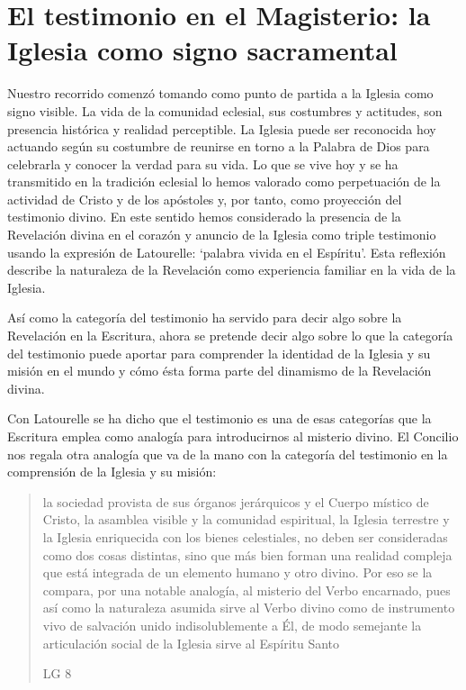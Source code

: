 \section{El testimonio en el Magisterio: la Iglesia como signo sacramental}

Nuestro recorrido comenzó tomando como punto de partida a la Iglesia como signo visible. La vida de la comunidad eclesial, sus costumbres y actitudes, son presencia histórica y realidad perceptible. La Iglesia puede ser reconocida hoy actuando según su costumbre de reunirse en torno a la Palabra de Dios para celebrarla y conocer la verdad para su vida. Lo que se vive hoy y se ha transmitido en la tradición eclesial lo hemos valorado como perpetuación de la actividad de Cristo y de los apóstoles y, por tanto, como proyección del testimonio divino. En este sentido hemos considerado la presencia de la Revelación divina en el corazón y anuncio de la Iglesia como triple testimonio usando la expresión de Latourelle: \enquote*{palabra vivida en el Espíritu}. Esta reflexión describe la naturaleza de la Revelación como experiencia familiar en la vida de la Iglesia.

Así como la categoría del testimonio ha servido para decir algo sobre la Revelación en la Escritura, ahora se pretende decir algo sobre lo que la categoría del testimonio puede aportar para comprender la identidad de la Iglesia y su misión en el mundo y cómo ésta forma parte del dinamismo de la Revelación divina.

Con Latourelle se ha dicho que el testimonio es una de esas categorías que la Escritura emplea como analogía para introducirnos al misterio divino. El Concilio nos regala otra analogía que va de la mano con la categoría del testimonio en la comprensión de la Iglesia y su misión: \blockquote[LG 8]{la sociedad provista de sus órganos jerárquicos y el Cuerpo místico de Cristo, la asamblea visible y la comunidad espiritual, la Iglesia terrestre y la Iglesia enriquecida con los bienes celestiales, no deben ser consideradas como dos cosas distintas, sino que más bien forman una realidad compleja que está integrada de un elemento humano y otro divino. Por eso se la compara, por una notable analogía, al misterio del Verbo encarnado, pues así como la naturaleza asumida sirve al Verbo divino como de instrumento vivo de salvación unido indisolublemente a Él, de modo semejante la articulación social de la Iglesia sirve al Espíritu Santo}

